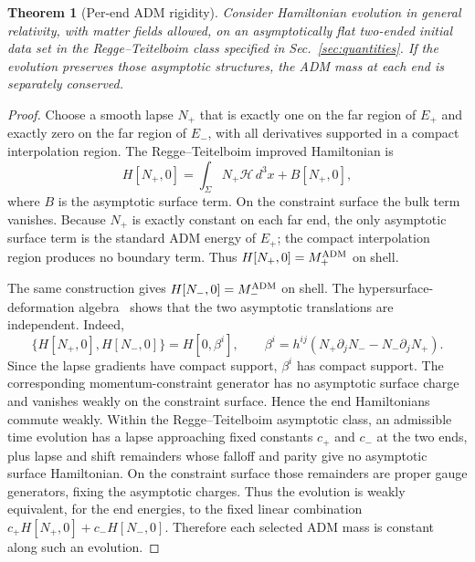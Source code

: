 \documentclass[aps,prd,10pt,onecolumn,nofootinbib,superscriptaddress,floatfix]{revtex4-2}
\newtheorem{theorem}{Theorem}
\begin{document}
\begin{theorem}[Per-end ADM rigidity]
\label{thm:adm-rigidity}
Consider Hamiltonian evolution in general relativity, with matter fields
allowed, on an asymptotically flat two-ended initial data set in the
Regge--Teitelboim class specified in Sec.~\ref{sec:quantities}.  If the
evolution preserves those asymptotic structures, the ADM mass at each end is
separately conserved.
\end{theorem}

\begin{proof}
Choose a smooth lapse $N_+$ that is exactly one on the far region of $E_+$ and
exactly zero on the far region of $E_-$, with all derivatives supported in a
compact interpolation region.  The Regge--Teitelboim improved Hamiltonian is
\begin{equation}
  H[N_+,0]=\int_\Sigma N_+\mathcal H\,d^3x+B[N_+,0],
\end{equation}
where $B$ is the asymptotic surface term.  On the constraint surface the bulk
term vanishes.  Because $N_+$ is exactly constant on each far end, the only
asymptotic surface term is the standard ADM energy of $E_+$; the compact
interpolation region produces no boundary term.  Thus $H[N_+,0]=M_+^{\rm ADM}$
on shell.

The same construction gives $H[N_-,0]=M_-^{\rm ADM}$ on shell.  The
hypersurface-deformation algebra~\cite{HojmanKucharTeitelboim1976Geometrodynamics}
shows that the two asymptotic translations are independent.  Indeed,
\begin{equation}
  \{H[N_+,0],H[N_-,0]\}=H[0,\beta^i],
  \qquad
  \beta^i=h^{ij}(N_+\partial_jN_- - N_-\partial_jN_+).
\end{equation}
Since the lapse gradients have compact support, $\beta^i$ has compact support.
The corresponding momentum-constraint generator has no asymptotic surface
charge and vanishes weakly on the constraint surface.  Hence the end
Hamiltonians commute weakly.  Within the Regge--Teitelboim asymptotic class,
an admissible time evolution has a lapse approaching fixed constants $c_+$ and
$c_-$ at the two ends, plus lapse and shift remainders whose falloff and parity
give no asymptotic surface Hamiltonian.  On the constraint surface those
remainders are proper gauge generators, fixing the asymptotic charges.  Thus
the evolution is weakly equivalent, for the
end energies, to the fixed linear combination
$c_+H[N_+,0]+c_-H[N_-,0]$.  Therefore each selected ADM mass is constant along
such an evolution.
\end{proof}
\end{document}
